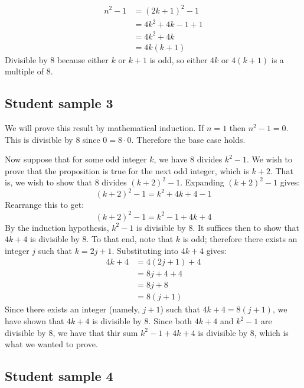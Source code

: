 \documentclass[11pt,letterpaper]{article}
\begin{document}
\begin{align*}
	n^2 - 1 &= (2k+1)^2 - 1 \\ 
	&= 4k^2 + 4k - 1 + 1 \\
	&= 4k^2 + 4k \\
	&= 4k(k+1)
\end{align*}
Divisible by 8 because either $k$ or $k+1$ is odd, so either $4k$ or $4(k+1)$ is a multiple of $8$.


\subsection*{Student sample 3} %
\label{sub:student_sample_3}


We will prove this result by mathematical induction. If $n=1$ then $n^2 - 1=0$. This is divisible by $8$ since $0 = 8 \cdot 0$. Therefore the base case holds. 

Now suppose that for some odd integer $k$, we have $8$ divides $k^2 - 1$. We wish to prove that the proposition is true for the next odd integer, which is $k+2$. That is, we wish to show that $8$ divides $(k+2)^2 - 1$. Expanding $(k+2)^2 - 1$ gives: 
\begin{equation}
	(k+2)^2 - 1 = k^2 + 4k + 4 - 1
\end{equation}
Rearrange this to get: 
\begin{equation}
	(k+2)^2 - 1 = k^2 - 1 + 4k + 4
\end{equation}
By the induction hypothesis, $k^2 - 1$ is divisible by 8. It suffices then to show that $4k+4$ is divisible by $8$. To that end, note that $k$ is odd; therefore there exists an integer $j$ such that $k = 2j+1$. Substituting into $4k+4$ gives: 
\begin{align*}
	4k+4 &= 4(2j+1) + 4 \\
	&= 8j + 4 + 4 \\
	&= 8j + 8 \\
	&= 8(j+1)
\end{align*}
Since there exists an integer (namely, $j+1$) such that $4k+4 = 8(j+1)$, we have shown that $4k+4$ is divisible by $8$. Since both $4k+4$ and $k^2 - 1$ are divisible by $8$, we have that thir sum $k^2 - 1 + 4k + 4$ is divisible by $8$, which is what we wanted to prove. 


\subsection*{Student sample 4} %
\label{sub:student_sample_3}
\end{document}
